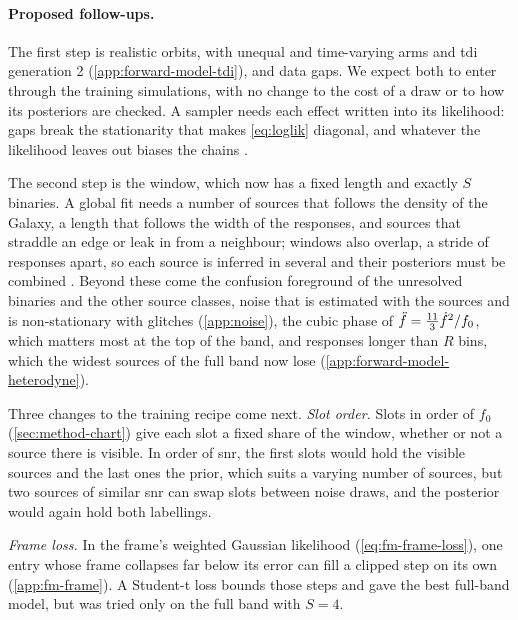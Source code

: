 \paragraph{Proposed follow-ups.}
\label{sec:followups}
The first step is realistic orbits, with unequal and time-varying arms and \ac{tdi} generation 2
(\cref{app:forward-model-tdi}), and data gaps. We expect both to enter through the training
simulations, with no change to the cost of a draw or to how its posteriors are checked. A sampler
needs each effect written into its likelihood: gaps break the stationarity that makes
\cref{eq:loglik} diagonal, and whatever the likelihood leaves out biases the chains
\citep{baghi2019gravitational,dey2021effect}.

The second step is the window, which now has a fixed length and exactly $S$ binaries. A global fit
needs a number of sources that follows the density of the Galaxy, a length that follows the width
of the responses, and sources that straddle an edge or leak in from a neighbour; windows also
overlap, a stride of \ForwardModelWindowStride{} responses apart, so each source is inferred in
several and their posteriors must be combined \citep{littenberg2020global}. Beyond these come the
confusion foreground of the unresolved binaries
\citep{timpano2006characterizing,karnesis2021characterization} and the other source classes, noise
that is estimated with the sources and is non-stationary with glitches (\cref{app:noise}), the cubic
phase of $\ddot f = \tfrac{11}{3}\dot f^2/f_0$, which matters most at the top of the band, and
responses longer than $R$ bins, which the widest sources of the full band now lose
(\cref{app:forward-model-heterodyne}).

Three changes to the training recipe come next. \emph{Slot order.} Slots in order of $f_0$
(\cref{sec:method-chart}) give each slot a fixed share of the window, whether or not a source there
is visible. In order of \ac{snr}, the first slots would hold the visible sources and the last ones
the prior, which suits a varying number of sources, but two sources of similar \ac{snr} can swap
slots between noise draws, and the posterior would again hold both labellings.

\emph{Frame loss.} In the frame's weighted Gaussian likelihood (\cref{eq:fm-frame-loss}), one entry
whose frame collapses far below its error can fill a clipped step on its own
(\cref{app:fm-frame}). A Student-t loss bounds those steps and gave the best full-band model, but
was tried only on the full band with $S=4$.

